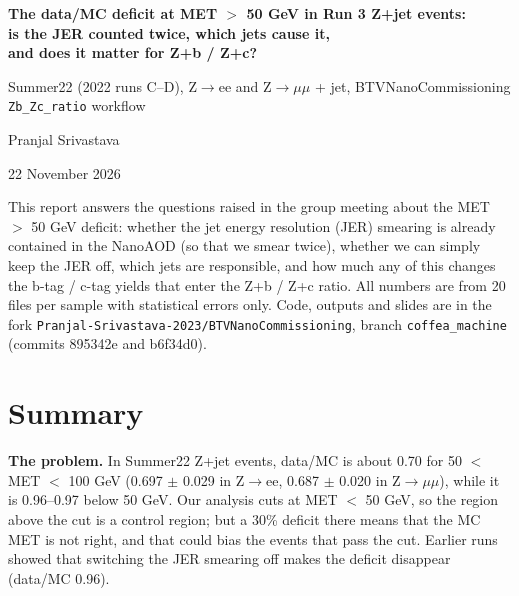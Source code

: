 \documentclass[11pt,a4paper]{article}
\newcommand{\Zee}{Z$\to$ee}
\newcommand{\Zmm}{Z$\to\mu\mu$}
\begin{document}
\begin{titlepage}
\centering
\vspace*{2.5cm}
{\LARGE\bfseries The data/MC deficit at MET $>$ 50 GeV in Run 3 Z+jet events:\\[6pt]
is the JER counted twice, which jets cause it,\\[6pt] and does it matter for Z+b / Z+c?\par}
\vspace{1.2cm}
{\large Summer22 (2022 runs C--D), \Zee{} and \Zmm{} + jet, BTVNanoCommissioning \texttt{Zb\_Zc\_ratio} workflow\par}
\vspace{1.2cm}
{\large Pranjal Srivastava\par}
\vspace{0.4cm}
{\large 22 November 2026\par}
\vfill
\begin{minipage}{0.85\linewidth}
\small
This report answers the questions raised in the group meeting about the MET $>$ 50 GeV deficit:
whether the jet energy resolution (JER) smearing is already contained in the NanoAOD (so that we smear twice),
whether we can simply keep the JER off, which jets are responsible, and how much any of this changes the
b-tag / c-tag yields that enter the Z+b / Z+c ratio. All numbers are from 20 files per sample with statistical errors only.
Code, outputs and slides are in the fork \texttt{Pranjal-Srivastava-2023/BTVNanoCommissioning}, branch
\texttt{coffea\_machine} (commits 895342e and b6f34d0).
\end{minipage}
\vspace{1.5cm}
\end{titlepage}

\tableofcontents
\newpage

\section{Summary}

\textbf{The problem.} In Summer22 Z+jet events, data/MC is about 0.70 for 50 $<$ MET $<$ 100 GeV
(0.697 $\pm$ 0.029 in \Zee, 0.687 $\pm$ 0.020 in \Zmm), while it is 0.96--0.97 below 50 GeV.
Our analysis cuts at MET $<$ 50 GeV, so the region above the cut is a control region; but a 30\% deficit there
means that the MC MET is not right, and that could bias the events that pass the cut.
Earlier runs showed that switching the JER smearing off makes the deficit disappear (data/MC 0.96).
\end{document}
